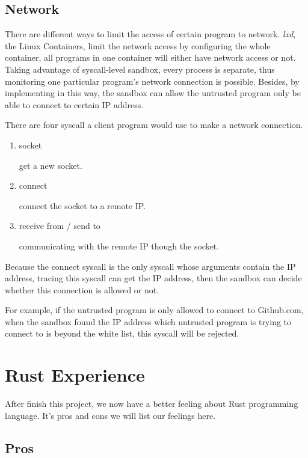\documentclass[conference,compsoc]{IEEEtran}
\begin{document}
		\subsection{Network}
			\par
				There are different ways to limit the access of certain program to network. 
				\emph{lxd}, the Linux Containers, limit the network access by configuring the whole container, all programs in one container will either have network access or not. 
				Taking advantage of syscall-level sandbox, every process is separate, thus monitoring one particular program's network connection is possible. 
				Besides, by implementing in this way, the sandbox can allow the untrusted program only be able to connect to certain IP address.
			\par
				There are four syscall a client program would use to make a network connection. 
			\begin{enumerate}
			\item socket
				\par
				get a new socket.
			\item connect
				\par
				connect the socket to a remote IP.
			\item receive from / send to
				\par
				communicating with the remote IP though the socket.
			\end{enumerate}
			\par 
				Because the connect syscall is the only syscall whose arguments contain the IP address, tracing this syscall can get the IP address, then the sandbox can decide whether this connection is allowed or not. 
			\par
				For example, if the untrusted program is only allowed to connect to Github.com, when the sandbox found the IP address which untrusted program is trying to connect to is beyond the white list, this syscall will be rejected.
			

\section{Rust Experience}
	After finish this project, we now have a better feeling about Rust programming language. It's pros and cons we will list our feelings here.
	\subsection{Pros}
		\par
\end{document}
